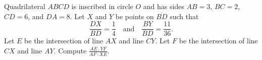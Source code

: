 Quadrilateral $ABCD$ is inscribed in circle $O$ and has sides $AB=3$, $BC=2$, $CD=6$, and $DA=8$. Let $X$ and $Y$ be points on $\overline{BD}$ such that $$\frac{DX}{BD}=\frac{1}{4}\quad\text{and}\quad\frac{BY}{BD}=\frac{11}{36}.$$ Let $E$ be the intersection of line $AX$ and line $CY$. Let $F$ be the intersection of line $CX$ and line $AY$. Compute $\frac{AE\cdot YF}{AF\cdot XE}$.